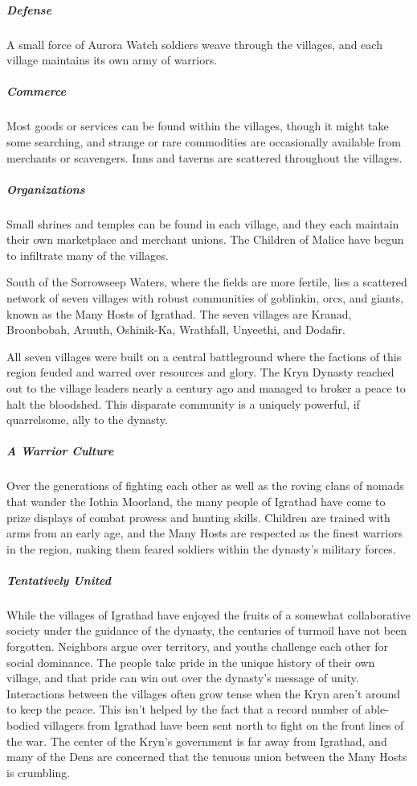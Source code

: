 \documentclass[10pt,a4paper,twoside,bg=print,twocolumn,openany,nodeprecatedcode]{dndbook}
\begin{document}
\subparagraph{Defense}
A small force of Aurora Watch soldiers weave through the villages, and each village maintains its own army of warriors.

\subparagraph{Commerce}
Most goods or services can be found within the villages, though it might take some searching, and strange or rare commodities are occasionally available from merchants or scavengers. Inns and taverns are scattered throughout the villages.

\subparagraph{Organizations}
Small shrines and temples can be found in each village, and they each maintain their own marketplace and merchant unions. The Children of Malice have begun to infiltrate many of the villages.

South of the Sorrowseep Waters, where the fields are more fertile, lies a scattered network of seven villages with robust communities of goblinkin, orcs, and giants, known as the Many Hosts of Igrathad. The seven villages are Kranad, Broonbobah, Aruuth, Oshinik-Ka, Wrathfall, Unyeethi, and Dodafir.

All seven villages were built on a central battleground where the factions of this region feuded and warred over resources and glory. The Kryn Dynasty reached out to the village leaders nearly a century ago and managed to broker a peace to halt the bloodshed. This disparate community is a uniquely powerful, if quarrelsome, ally to the dynasty.

\subparagraph{A Warrior Culture}
Over the generations of fighting each other as well as the roving clans of nomads that wander the Iothia Moorland, the many people of Igrathad have come to prize displays of combat prowess and hunting skills. Children are trained with arms from an early age, and the Many Hosts are respected as the finest warriors in the region, making them feared soldiers within the dynasty's military forces.

\subparagraph{Tentatively United}
While the villages of Igrathad have enjoyed the fruits of a somewhat collaborative society under the guidance of the dynasty, the centuries of turmoil have not been forgotten. Neighbors argue over territory, and youths challenge each other for social dominance. The people take pride in the unique history of their own village, and that pride can win out over the dynasty's message of unity. Interactions between the villages often grow tense when the Kryn aren't around to keep the peace. This isn't helped by the fact that a record number of able-bodied villagers from Igrathad have been sent north to fight on the front lines of the war. The center of the Kryn's government is far away from Igrathad, and many of the Dens are concerned that the tenuous union between the Many Hosts is crumbling.
\end{document}
